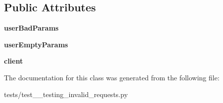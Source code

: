 \subsection*{Public Attributes}
\begin{DoxyCompactItemize}
\item 
\mbox{\label{classtests_1_1test__15__testing__invalid__requests_1_1_test_user_routes_ab7eec879fe32c09ba5e4c4f8ea7bcc47}} 
{\bfseries user\+Bad\+Params}
\item 
\mbox{\label{classtests_1_1test__15__testing__invalid__requests_1_1_test_user_routes_ad2608b0d42c90848bbc5341233dbd7b1}} 
{\bfseries user\+Empty\+Params}
\item 
\mbox{\label{classtests_1_1test__15__testing__invalid__requests_1_1_test_user_routes_a74bea85b551a5ff99a386d32391acc21}} 
{\bfseries client}
\end{DoxyCompactItemize}


The documentation for this class was generated from the following file\+:\begin{DoxyCompactItemize}
\item 
tests/test\+\_\+\_\+testing\+\_\+invalid\+\_\+requests.\+py\end{DoxyCompactItemize}
